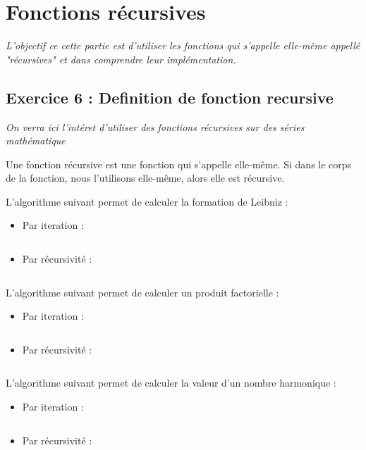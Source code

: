 \section{Fonctions récursives}
\textit{L’objectif ce cette partie est d’utiliser les fonctions qui s’appelle elle-même appellé "récursives" et dans comprendre leur implémentation.}

\subsection{Exercice 6 : Definition de fonction recursive}
\textit{On verra ici l'intéret d'utiliser des fonctions récursives sur des séries mathématique}

Une fonction récursive est une fonction qui s'appelle elle-même. Si dans le corps de la fonction, nous l'utilisons elle-même, alors elle est récursive.

L'algorithme suivant permet de calculer la formation de Leibniz :

\begin{itemize}
\item Par iteration :
\inputminted[linenos,firstline=7, lastline=14]{cpp}{../sources/cpp/TP1-2/piLeibniz.c}
\item Par récursivité :
\inputminted[linenos,firstline=16, lastline=19]{cpp}{../sources/cpp/TP1-2/piLeibniz.c}
\end{itemize}

L'algorithme suivant permet de calculer un produit factorielle :

\begin{itemize}
\item Par iteration :
\inputminted[linenos,firstline=7, lastline=14]{cpp}{../sources/cpp/TP1-2/factorielle.c}
\item Par récursivité :
\inputminted[linenos,firstline=16, lastline=21]{cpp}{../sources/cpp/TP1-2/factorielle.c}
\end{itemize}

L'algorithme suivant permet de calculer la valeur d'un nombre harmonique :

\begin{itemize}
\item Par iteration :
\inputminted[linenos,firstline=7, lastline=14]{cpp}{../sources/cpp/TP1-2/harmonique.c}
\item Par récursivité :
\inputminted[linenos,firstline=16, lastline=21]{cpp}{../sources/cpp/TP1-2/harmonique.c}
\end{itemize}

